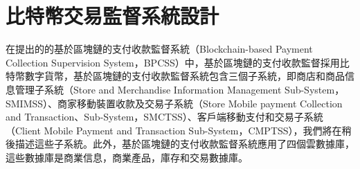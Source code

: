 
\chapter{比特幣交易監督系統設計}
在提出的的基於區塊鏈的支付收款監督系統（Blockchain-based Payment Collection Supervision System，BPCSS）中，基於區塊鏈的支付收款監督採用比特幣數字貨幣，基於區塊鏈的支付收款監督系統包含三個子系統，即商店和商品信息管理子系統（Store and Merchandise Information Management Sub-System，SMIMSS）、商家移動裝置收款及交易子系統（Store Mobile payment Collection and Transaction、Sub-System，SMCTSS）、客戶端移動支付和交易子系統（Client Mobile Payment and Transaction Sub-System，CMPTSS），我們將在稍後描述這些子系統。此外，基於區塊鏈的支付收款監督系統應用了四個雲數據庫，這些數據庫是商業信息，商業產品，庫存和交易數據庫。 

